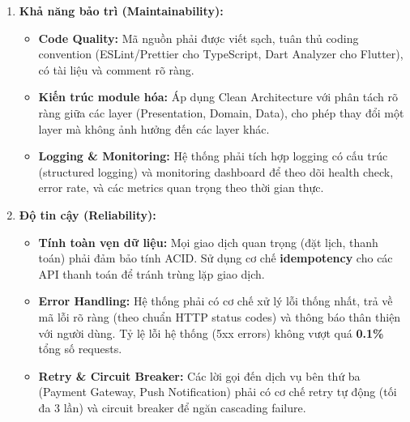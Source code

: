 \begin{enumerate}
\begin{itemize}
        \item \textbf{Hỗ trợ người dùng:} Cung cấp tài liệu hướng dẫn (FAQ), tooltip trên các chức năng phức tạp, và các kênh hỗ trợ dễ tiếp cận ngay trong ứng dụng/portal.
    \end{itemize}
    \item \textbf{Khả năng bảo trì (Maintainability):}
    \begin{itemize}
        \item \textbf{Code Quality:} Mã nguồn phải được viết sạch, tuân thủ coding convention (ESLint/Prettier cho TypeScript, Dart Analyzer cho Flutter), có tài liệu và comment rõ ràng.
        \item \textbf{Kiến trúc module hóa:} Áp dụng Clean Architecture với phân tách rõ ràng giữa các layer (Presentation, Domain, Data), cho phép thay đổi một layer mà không ảnh hưởng đến các layer khác.
        \item \textbf{Logging \& Monitoring:} Hệ thống phải tích hợp logging có cấu trúc (structured logging) và monitoring dashboard để theo dõi health check, error rate, và các metrics quan trọng theo thời gian thực.
    \end{itemize}

    \item \textbf{Độ tin cậy (Reliability):}
    \begin{itemize}
        \item \textbf{Tính toàn vẹn dữ liệu:} Mọi giao dịch quan trọng (đặt lịch, thanh toán) phải đảm bảo tính ACID. Sử dụng cơ chế \textbf{idempotency} cho các API thanh toán để tránh trùng lặp giao dịch.
        \item \textbf{Error Handling:} Hệ thống phải có cơ chế xử lý lỗi thống nhất, trả về mã lỗi rõ ràng (theo chuẩn HTTP status codes) và thông báo thân thiện với người dùng. Tỷ lệ lỗi hệ thống (5xx errors) không vượt quá \textbf{0.1\%} tổng số requests.
        \item \textbf{Retry \& Circuit Breaker:} Các lời gọi đến dịch vụ bên thứ ba (Payment Gateway, Push Notification) phải có cơ chế retry tự động (tối đa 3 lần) và circuit breaker để ngăn cascading failure.
    \end{itemize}
\end{enumerate}

